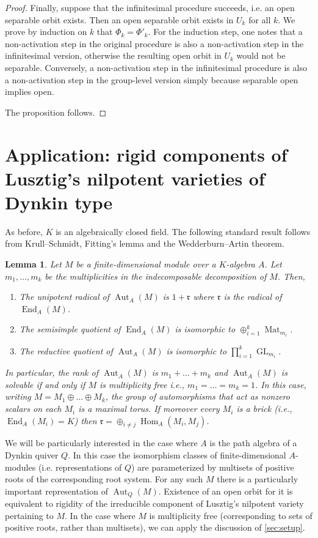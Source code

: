 \documentclass[12pt]{article}
\newtheorem{lemma}[theorem]{Lemma}
\newcommand{\Hom}{\operatorname{Hom}}
\newcommand{\End}{\operatorname{End}}
\newcommand{\Aut}{\operatorname{Aut}}
\newcommand{\Mat}{\operatorname{Mat}}
\newcommand{\GL}{\operatorname{GL}}
\begin{document}
\begin{proof}
Finally, suppose that the infinitesimal procedure succeeds, i.e. an open separable orbit exists.
Then an open separable orbit exists in $U_k$ for all $k$.
We prove by induction on $k$ that $\Phi_k=\Phi'_k$.
For the induction step, one notes that a non-activation step in the original procedure is also a non-activation step
in the infinitesimal version, otherwise the resulting open orbit in $U_k$ would not be separable.
Conversely, a non-activation step in the infinitesimal procedure is also a non-activation step
in the group-level version simply because separable open implies open.

The proposition follows.
\end{proof}



\section{Application: rigid components of Lusztig's nilpotent varieties of Dynkin type}\label{sec:quiver}

As before, $K$ is an algebraically closed field.
The following standard result follows from Krull--Schmidt, Fitting's lemma and the Wedderburn--Artin theorem.

\begin{lemma} \label{lem: indecomprank}
Let $M$ be a finite-dimensional module over a $K$-algebra $A$.
Let $m_1,\dots,m_k$ be the multiplicities in the indecomposable decomposition of $M$.
Then,
\begin{enumerate}
\item The unipotent radical of $\Aut_A(M)$ is $1+\mathfrak{r}$ where $\mathfrak{r}$ is the radical of $\End_A(M)$.
\item The semisimple quotient of $\End_A(M)$ is isomorphic to $\oplus_{i=1}^k\Mat_{m_i}$.
\item The reductive quotient of $\Aut_A(M)$ is isomorphic to $\prod_{i=1}^k\GL_{m_i}$.
\end{enumerate}
In particular, the rank of $\Aut_A(M)$ is $m_1+\dots+m_k$ and $\Aut_A(M)$ is solvable if and only if $M$ is multiplicity free
i.e., $m_1=\dots=m_k=1$. In this case, writing $M=M_1\oplus\dots\oplus M_k$, the group of automorphisms that act as nonzero scalars on each $M_i$ is a maximal torus.
If moreover every $M_i$ is a brick (i.e., $\End_A(M_i)=K$) then $\mathfrak{r}=\oplus_{i\ne j}\Hom_A(M_i,M_j)$.
\end{lemma}


We will be particularly interested in the case where $A$ is the path algebra of a Dynkin quiver $Q$.
In this case the isomorphism classes of finite-dimensional $A$-modules (i.e. representations of $Q$) are parameterized by multisets of positive roots of the corresponding root system.
For any such $M$ there is a particularly important representation of $\Aut_Q(M)$. Existence of an open orbit for it is equivalent to rigidity of the irreducible component
of Lusztig's nilpotent variety pertaining to $M$.
In the case where $M$ is multiplicity free (corresponding to sets of positive roots, rather than multisets),
we can apply the discussion of \cref{sec:setup}.
\end{document}

